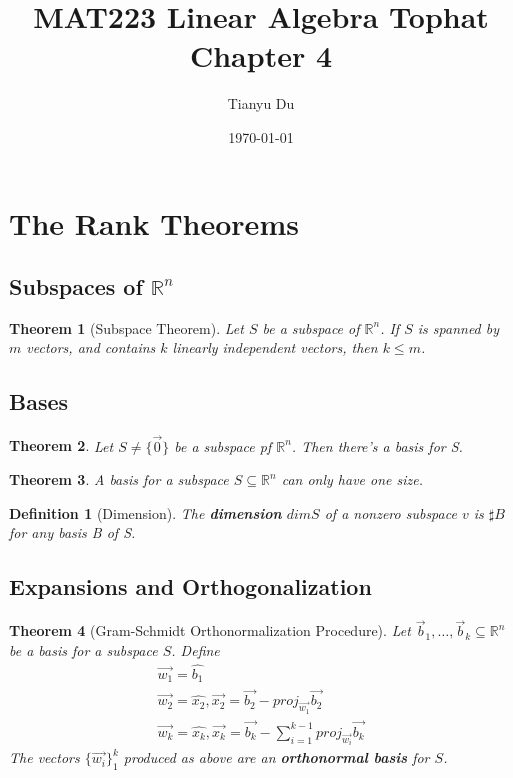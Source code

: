 \documentclass[11pt]{article}
\author{Tianyu Du}
\title{MAT223 Linear Algebra Tophat Chapter 4}
\date{\today}
\newtheorem{theorem}{Theorem}
\newtheorem{definition}{Definition}
\newcommand{\proj}[2]{proj_{\vec{#2}} \vec{#1}}
\newcommand{\re}[1]{\mathbb{R}^#1}
\begin{document}
	\maketitle
	\doclicenseThis
	\section{The Rank Theorems}
	\subsection{Subspaces of $\mathbb{R}^n$}
	\begin{theorem}[Subspace Theorem]
		Let $S$ be a subspace of $\mathbb{R} ^ n$. If $S$ is spanned by $m$ vectors, and contains $k$ linearly independent vectors, then $k \leq m$.
	\end{theorem}
	\subsection{Bases}
	\begin{theorem}
		Let $S \neq \{\vec{0}\}$ be a subspace pf $\mathbb{R} ^ n$. Then there's a basis for S.
	\end{theorem}
	\begin{theorem}
		A basis for a subspace $S \subseteq \mathbb{R}^n$ can only have one size.
	\end{theorem}
	\begin{definition}[Dimension]
		The \textbf{dimension} $dim S$ of a nonzero subspace $v$ is $\sharp B$ for any basis B of S.
	\end{definition}
	\subsection{Expansions and Orthogonalization}
	\begin{theorem}[Gram-Schmidt Orthonormalization Procedure]
		Let ${\vec{b}_1,\dots,\vec{b}_k} \subseteq \re{n}$ be a basis for a subspace $S$. Define
		\begin{align*}
			\vec{w_1} = \hat{b_1} \\
			\vec{w_2} = \hat{x_2}, \vec{x_2} = \vec{b_2} - \proj{b_2}{w_1} \\
			\vec{w_k} = \hat{x_k}, \vec{x_k} = \vec{b_k} - \sum_{i=1}^{k-1}\proj{b_k}{w_i}
		\end{align*}
		The vectors $\{\vec{w_i}\}_1^k$ produced as above are an \textbf{orthonormal basis} for $S$.
	\end{theorem}
\end{document}
